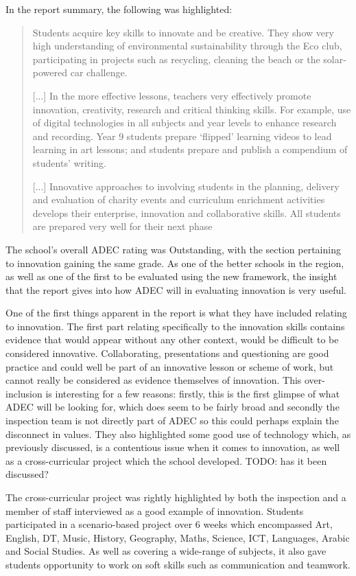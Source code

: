 In the report summary, the following was highlighted:
\begin{quote}
Students acquire key skills to innovate and be creative. They show very high understanding of environmental sustainability through the Eco club, participating in projects such as recycling, cleaning the beach or the solar-powered car challenge.

[...] In the more effective lessons, teachers very effectively promote innovation, creativity, research and critical thinking skills. For example, use of digital technologies in all subjects and year levels to enhance research and recording. Year 9 students prepare ‘flipped’ learning videos to lead learning in art lessons; and students prepare and publish a compendium of students’ writing.

[...] Innovative approaches to involving students in the planning, delivery and evaluation of charity events and curriculum enrichment activities develops their enterprise, innovation and collaborative skills. All students are prepared very well for their next phase
\end{quote}

The school's overall ADEC rating was Outstanding, with the section pertaining to innovation gaining the same grade. As one of the better schools in the region, as well as one of the first to be evaluated using the new framework, the insight that the report gives into how ADEC will in evaluating innovation is very useful.

One of the first things apparent in the report is what they have included relating to innovation. The first part relating specifically to the innovation skills contains evidence that would appear without any other context, would be difficult to be considered innovative. Collaborating, presentations and questioning are good practice and could well be part of an innovative lesson or scheme of work, but cannot really be considered as evidence themselves of innovation. This over-inclusion is interesting for a few reasons: firstly, this is the first glimpse of what ADEC will be looking for, which does seem to be fairly broad and secondly the inspection team is not directly part of ADEC so this could perhaps explain the disconnect in values. They also highlighted some good use of technology which, as previously discussed, is a contentious issue when it comes to innovation, as well as a cross-curricular project which the school developed. TODO: has it been discussed?

The cross-curricular project was rightly highlighted by both the inspection and a member of staff interviewed as a good example of innovation. Students participated in a scenario-based project over 6 weeks which encompassed Art, English, DT, Music, History, Geography, Maths, Science, ICT, Languages, Arabic and Social Studies. As well as covering a wide-range of subjects, it also gave students opportunity to work on soft skills such as communication and teamwork. 

